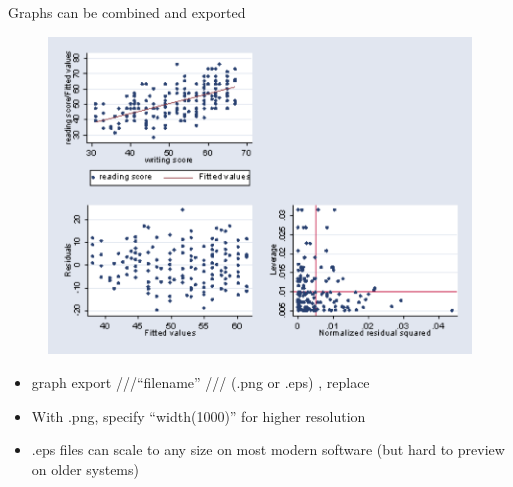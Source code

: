 \documentclass[aspectratio=169]{beamer}
\begin{document}
\begin{frame}[fragile]{Graphs can be combined and exported}
\begin{multicols}{2}	
	\begin{figure}
		\centering
		\includegraphics[width=\linewidth]{img/grcombine}
	\end{figure}
	\begin{itemize}
		\item graph export ///\newline “filename” /// (.png or .eps) \newline, replace
		\item With .png, specify “width(1000)” for higher resolution
		\item .eps files can scale to any size on most modern software (but hard to preview on older systems)
	\end{itemize}
\end{multicols}
\end{frame}
\end{document}

